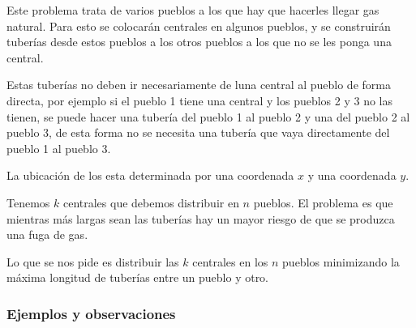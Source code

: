 Este problema trata de varios pueblos a los que hay que hacerles llegar gas natural. Para esto se colocarán centrales en algunos pueblos, y se construirán tuberías desde estos pueblos a los otros pueblos a los que no se les ponga una central. 

Estas tuberías no deben ir necesariamente de luna central al pueblo de forma directa, por ejemplo si el pueblo 1 tiene una central y los pueblos 2 y 3 no las tienen, se puede hacer una tubería del pueblo 1 al pueblo 2 y una del pueblo 2 al pueblo 3, de esta forma no se necesita una tubería que vaya directamente del pueblo 1 al pueblo 3.

La ubicación de los esta determinada por una coordenada $x$ y una coordenada $y$.

Tenemos $k$ centrales que debemos distribuir en $n$ pueblos. El problema es que mientras más largas sean las tuberías hay un mayor riesgo de que se produzca una fuga de gas.

Lo que se nos pide es distribuir las $k$ centrales en los $n$ pueblos minimizando la máxima longitud de tuberías entre un pueblo y otro.

\subsubsection{Ejemplos y observaciones}


